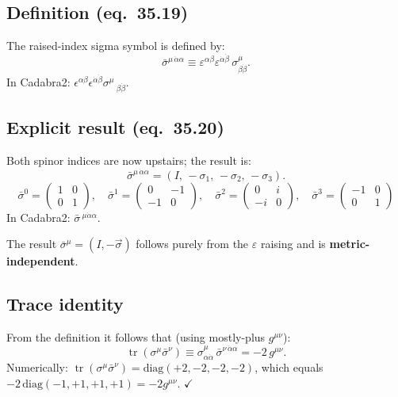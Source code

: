 \documentclass[12pt]{article}
\newcommand{\dal}{\dot\alpha}
\newcommand{\dbe}{\dot\beta}
\begin{document}
\subsection{Definition (eq.~35.19)}

The raised-index sigma symbol is defined by:
\begin{equation}
  \bar\sigma^{\mu\,\dot\alpha\alpha}
  \equiv \varepsilon^{\alpha\beta}\varepsilon^{\dot\alpha\dot\beta}\,
         \sigma^\mu_{\beta\dot\beta}.
  \tag{35.19}
\end{equation}
In Cadabra2: $\epsilon^{\alpha \beta} \epsilon^{\dal \dbe} \sigma^{\mu}\,_{\beta \dbe}$.

\subsection{Explicit result (eq.~35.20)}

Both spinor indices are now upstairs; the result is:
\begin{equation}
  \bar\sigma^{\mu\,\dot\alpha\alpha}
  = (I,\,-\sigma_1,\,-\sigma_2,\,-\sigma_3).
  \tag{35.20}
\end{equation}
\[
  \bar\sigma^0 = \begin{pmatrix}1 & 0 \\ 0 & 1\end{pmatrix},\quad
  \bar\sigma^1 = \begin{pmatrix}0 & -1 \\ -1 & 0\end{pmatrix},\quad
  \bar\sigma^2 = \begin{pmatrix}0 & i \\ -i & 0\end{pmatrix},\quad
  \bar\sigma^3 = \begin{pmatrix}-1 & 0 \\ 0 & 1\end{pmatrix}
\]
In Cadabra2: $\bar{\sigma}\,^{\mu \dal \alpha}$.

The result $\bar\sigma^\mu = (I,-\vec\sigma)$ follows purely from the
$\varepsilon$ raising and is \textbf{metric-independent}.

\subsection{Trace identity}

From the definition it follows that (using mostly-plus $g^{\mu\nu}$):
\begin{equation}
  \operatorname{tr}(\sigma^\mu\bar\sigma^\nu)
  \equiv \sigma^\mu_{\alpha\dot\alpha}\,\bar\sigma^{\nu\,\dot\alpha\alpha}
  = -2\,g^{\mu\nu}.
  \tag{35-trace}
\end{equation}
Numerically: $\operatorname{tr}(\sigma^\mu\bar\sigma^\nu) = \mathrm{diag}(+2,-2,-2,-2)$,
which equals $-2\,\mathrm{diag}(-1,+1,+1,+1) = -2g^{\mu\nu}$. $\checkmark$
\end{document}
